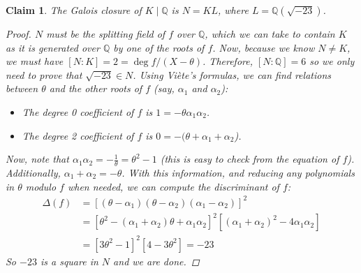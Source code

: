 \documentclass[11pt]{article}
\newtheorem{claim}[theorem]{Claim}
\theoremstyle{definition}
\begin{document}
    \begin{claim}
        The Galois closure of $K\mid\mathbb{Q}$ is $N = KL$,
        where $L = \mathbb{Q}\left(\sqrt{-23}\right)$.
        \begin{proof}

            $N$ must be the splitting field of $f$ over $\mathbb{Q}$,
            which we can take to contain $K$ as it is generated over $\mathbb{Q}$ by one of the roots of $f$.
            Now, because we know $N \neq K$, we must have $[N:K] = 2 = \deg f/(X - \theta)$.
            Therefore, $[N:\mathbb{Q}] = 6$ so we only need to prove that $\sqrt {-23} \in N$.
            Using Viète's formulas, we can find relations between $\theta$ and the other roots of $f$ (say, $\alpha_1$ and $\alpha_2$):
            \begin{itemize}
                \item The degree 0 coefficient of $f$ is $1 = - \theta \alpha_1 \alpha_2$.
                \item The degree 2 coefficient of $f$ is $0 = - (\theta + \alpha_1 + \alpha_2$).
            \end{itemize}
            Now, note that $\alpha_1 \alpha_2 = -\frac{1}{\theta} = \theta^2 - 1$ (this is easy to check from the equation of $f$).
            Additionally, $\alpha_1 + \alpha_2 = -\theta$.
            With this information, and reducing any polynomials in $\theta$ modulo $f$ when needed,
            we can compute the discriminant of $f$:
            \begin{align*}
                \Delta(f) &= [(\theta-\alpha_1) (\theta-\alpha_2) (\alpha_1 - \alpha_2)]^2 \\
                &= [\theta^2 - (\alpha_1 + \alpha_2) \theta + \alpha_1 \alpha_2]^2[(\alpha_1 + \alpha_2)^2 - 4 \alpha_1 \alpha_2] \\
                &= [3\theta^2-1]^2[4-3\theta^2] = -23
            \end{align*}
            So $-23$ is a square in $N$ and we are done.
        \end{proof}
        
    \end{claim}
\end{document}
